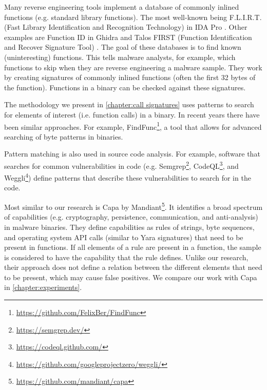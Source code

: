 \medskip

Many reverse engineering tools implement a database of commonly inlined functions (e.g. standard library functions). The most well-known being F.L.I.R.T. (Fast Library Identification and Recognition Technology) in IDA Pro \cite{flirt}. Other examples are Function ID in Ghidra \cite{ghidra-fid} and Talos FIRST (Function Identification and Recover Signature Tool) \cite{talos-first}. The goal of these databases is to find known (uninteresting) functions. This tells malware analysts, for example, which functions to skip when they are reverse engineering a malware sample. They work by creating signatures of commonly inlined functions (often the first 32 bytes of the function). Functions in a binary can be checked against these signatures.

\medskip

The methodology we present in \autoref{chapter:call signatures} uses patterns to search for elements of interest (i.e. function calls) in a binary. In recent years there have been similar approaches. For example, FindFunc\footnote{\tiny \url{https://github.com/FelixBer/FindFunc}}, a tool that allows for advanced searching of byte patterns in binaries.

Pattern matching is also used in source code analysis. For example, software that searches for common vulnerabilities in code (e.g. Semgrep\footnote{\tiny \url{https://semgrep.dev/}}, CodeQL\footnote{\tiny \url{https://codeql.github.com/}}, and Weggli\footnote{\tiny \url{https://github.com/googleprojectzero/weggli/}}) define patterns that describe these vulnerabilities to search for in the code.

\medskip

Most similar to our research is Capa by Mandiant\footnote{\tiny \url{https://github.com/mandiant/capa}}. It identifies a broad spectrum of capabilities (e.g. cryptography, persistence, communication, and anti-analysis) in malware binaries. They define capabilities as rules of strings, byte sequences, and operating system API calls (similar to Yara signatures) that need to be present in functions. If all elements of a rule are present in a function, the sample is considered to have the capability that the rule defines. Unlike our research, their approach does not define a relation between the different elements that need to be present, which may cause false positives. We compare our work with Capa in \autoref{chapter:experiments}.
